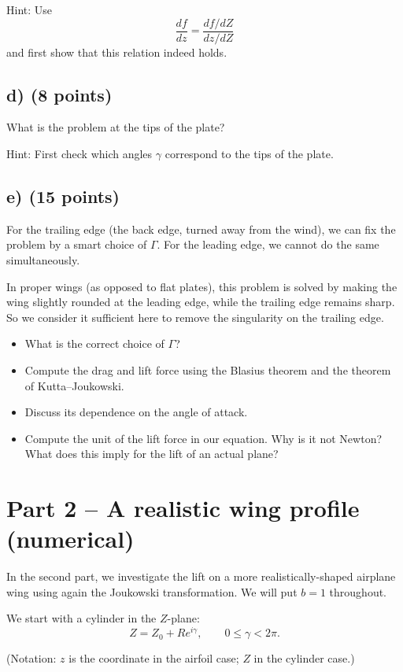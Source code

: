 \documentclass[11pt,a4paper]{article}
\begin{document}
Hint: Use
\[
\frac{df}{dz} = \frac{df/dZ}{dz/dZ}
\]
and first show that this relation indeed holds.

\subsection*{d) (8 points)}

What is the problem at the tips of the plate?

Hint: First check which angles $\gamma$ correspond to the tips of the plate.

\subsection*{e) (15 points)}

For the trailing edge (the back edge, turned away from the wind), we can fix the problem by a smart choice of $\Gamma$.
For the leading edge, we cannot do the same simultaneously.

In proper wings (as opposed to flat plates), this problem is solved by making the wing slightly rounded at the leading
edge, while the trailing edge remains sharp. So we consider it sufficient here to remove the singularity on the trailing edge.

\begin{itemize}[leftmargin=1.5em]
\item What is the correct choice of $\Gamma$?
\item Compute the drag and lift force using the Blasius theorem and the theorem of Kutta–Joukowski.
\item Discuss its dependence on the angle of attack.
\item Compute the unit of the lift force in our equation. Why is it not Newton? What does this imply for the lift of an actual plane?
\end{itemize}

\section*{Part 2 -- A realistic wing profile (numerical)}

In the second part, we investigate the lift on a more realistically-shaped airplane wing using again the Joukowski transformation.
We will put $b=1$ throughout.

We start with a cylinder in the $Z$-plane:
\[
Z = Z_0 + R e^{i\gamma}, \qquad 0 \le \gamma < 2\pi.
\]

(Notation: $z$ is the coordinate in the airfoil case; $Z$ in the cylinder case.)
\end{document}
